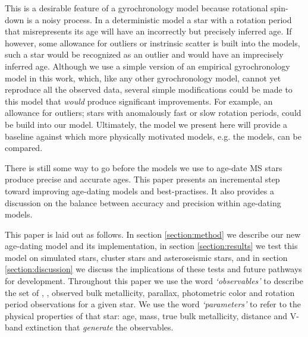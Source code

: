This is a desirable feature of a gyrochronology model because rotational
spin-down is a noisy process.
In a deterministic model a star with a rotation period that misrepresents its
age will have an incorrectly but precisely inferred age.
If however, some allowance for outliers or instrinsic scatter is built into
the models, such a star would be recognized as an outlier and would have an
imprecisely inferred age.
Although we use a simple version of an empirical gyrochronology model in this
work, which, like any other gyrochronology model, cannot yet reproduce all the
observed data, several simple modifications could be made to this model that
{\it would} produce significant improvements.
For example, an allowance for outliers; stars with anomalously fast or slow
rotation periods, could be build into our model.
Ultimately, the model we present here will provide a baseline against which
more physically motivated models, e.g. the \citet{vansaders2016} models, can
be compared.



There is still some way to go before the models we use to age-date
MS stars produce precise and accurate ages.
This paper presents an incremental step toward improving age-dating models and
best-practises.
It also provides a discussion on the balance between accuracy and precision
within age-dating models.

This paper is laid out as follows.
In section \ref{section:method} we describe our new age-dating model and its
implementation, in section \ref{section:results} we test this model on
simulated stars, cluster stars and asteroseismic stars, and in section
\ref{section:discussion} we discuss the implications of these tests and future
pathways for development.
Throughout this paper we use the word {\it `observables'} to describe the set
of \teff, \logg, observed bulk metallicity, parallax, photometric color and
rotation period observations for a given star.
We use the word {\it `parameters'} to refer to the physical properties of that
star: age, mass, true bulk metallicity, distance and V-band extinction that
{\it generate} the observables.
